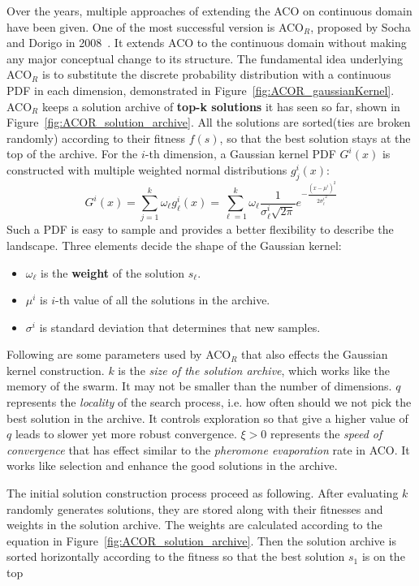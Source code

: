 Over the years, multiple approaches of extending the ACO on continuous domain have been given.
One of the most successful version is ACO$_{R}$, proposed by Socha and Dorigo in 2008~\cite{Socha:2008:ACOR}.
It extends ACO to the continuous domain without making any major conceptual change to its structure.
The fundamental idea underlying ACO$_{R}$ is to substitute the discrete probability distribution with a continuous PDF in each dimension, demonstrated in Figure~\ref{fig:ACOR_gaussianKernel}. 
ACO$_R$ keeps a solution archive of \textbf{top-k solutions} it has seen so far, shown in Figure~\ref{fig:ACOR_solution_archive}.
All the solutions are sorted(ties are broken randomly) according to their fitness $f(s)$, 
so that the best solution stays at the top of the archive.
For the $i$-th dimension, a Gaussian kernel PDF $G^i(x)$ is constructed with multiple weighted normal distributions $g_j^i(x)$: 
\begin{displaymath}
G^i(x) = \sum_{j = 1}^{k}\omega_{\ell}g_{\ell}^{i}(x) = 
\sum_{\ell = 1}^{k}\omega_{\ell} \frac{1}{\sigma_{\ell}^{i}\sqrt{2\pi}} e^{-\frac{ (x-\mu^i)^2 }{2 {\sigma^i_\ell}^2}}
\end{displaymath}
Such a PDF is easy to sample and provides a better flexibility to describe the landscape.
Three elements decide the shape of the Gaussian kernel:
\begin{itemize}
\item $\omega_\ell$ is the \textbf{weight} of the solution $s_\ell$.
\item $\mu^i$ is $i$-th value of all the solutions in the archive.
\item $\sigma^i$ is standard deviation that determines that new samples.
\end{itemize}
Following are some parameters used by ACO$_R$ that also effects the Gaussian kernel construction.
$k$ is the \textit{size of the solution archive}, which works like the memory of the swarm.
It may not be smaller than the number of dimensions.
$q$ represents the \textit{locality} of the search process, i.e. how often should we not pick the best solution in the archive.
It controls exploration so that give a higher value of $q$ leads to slower yet more robust convergence.
$\xi > 0$ represents the \textit{speed of convergence} that has effect similar to the \textit{pheromone evaporation} rate in ACO.
It works like selection and enhance the good solutions in the archive.

The initial solution construction process proceed as following.
After evaluating $k$ randomly generates solutions, they are stored along with their fitnesses and weights in the solution archive.
The weights are calculated according to the equation in Figure~\ref{fig:ACOR_solution_archive}.
Then the solution archive is sorted horizontally according to the fitness so that the best solution $s_1$ is on the top

